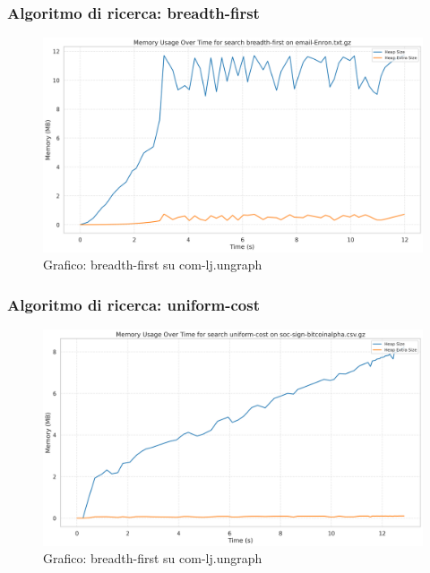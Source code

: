 \documentclass{article}
\begin{document}
\subsubsection{Algoritmo di ricerca: breadth-first}
\begin{figure}[h]\centering
\includegraphics[width=\textwidth]{../plots/email-Enron_breadth-first.png}
\caption{Grafico: breadth-first su com-lj.ungraph}
\end{figure}
\subsubsection{Algoritmo di ricerca: uniform-cost}
\begin{figure}[h]\centering
\includegraphics[width=\textwidth]{../plots/soc-sign-bitcoinalpha.csv_uniform-cost.png}
\caption{Grafico: breadth-first su com-lj.ungraph}
\end{figure}
\end{document}
